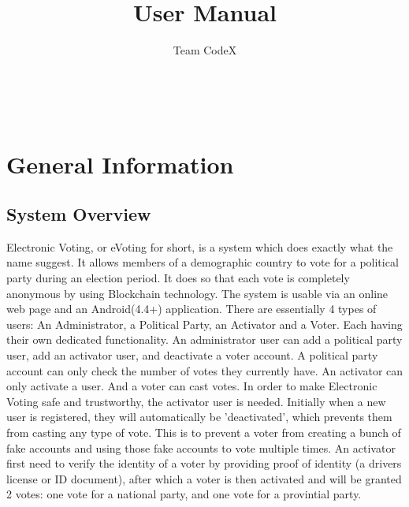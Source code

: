 \documentclass[11pt]{article}
\author{Team CodeX}
\title{User Manual}
\begin{document}
	\setcounter{tocdepth}{6}
	\setcounter{secnumdepth}{6}
	\setlength{\parskip}{6pt}
	
	
	
	\renewcommand{\thesection}{\arabic{section}}
	\newpage
	
	\tableofcontents
	
	\textsc{}\\[1cm]
	
	\newpage
	\section{General Information}
	\subsection{System Overview}
	Electronic Voting, or eVoting for short, is a system which does exactly what the name suggest. It allows members of a demographic country to vote for a political party during an election period. It does so that each vote is completely anonymous by using Blockchain technology.\newline\newline
	The system is usable via an online web page and an Android(4.4+) application.\newline\newline
	There are essentially 4 types of users: An Administrator, a Political Party, an Activator and a Voter. Each having their own dedicated functionality. An administrator user can add a political party user, add an activator user, and deactivate a voter account. A political party account can only check the number of votes they currently have. An activator can only activate a user. And a voter can cast votes.\newline\newline
	In order to make Electronic Voting safe and trustworthy, the activator user is needed. Initially when a new user is registered, they will automatically be 'deactivated', which prevents them from casting any type of vote. This is to prevent a voter from creating a bunch of fake accounts and using those fake accounts to vote multiple times. An activator first need to verify the identity of a voter by providing proof of identity (a drivers license or ID document), after which a voter is then activated and will be granted 2 votes: one vote for a national party, and one vote for a provintial party.\newline\newline
\end{document}
